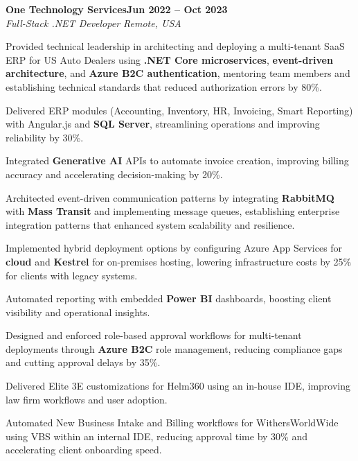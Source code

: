 \documentclass[letterpaper,10pt]{article}
\newcommand{\headingBf}[2]{
  \hspace{10pt}\textbf{#1}\hfill\textbf{#2}\\
}
\newcommand{\headingIt}[2]{
  \hspace{10pt}\textit{#1}\hfill\textit{#2}\\
}
\newenvironment{resume_list}{
  \vspace{-7pt}
  \begin{itemize}[itemsep=-2px, parsep=1pt, leftmargin=30pt]
}{
  \end{itemize}
}
\begin{document}
\headingBf{One Technology Services}{Jun 2022 -- Oct 2023}
\headingIt{Full-Stack .NET Developer \hfill Remote, USA}{}
\begin{resume_list}
    \item Provided technical leadership in architecting and deploying a multi-tenant SaaS ERP for US Auto Dealers using \textbf{.NET Core microservices}, \textbf{event-driven architecture}, and \textbf{Azure B2C authentication}, mentoring team members and establishing technical standards that reduced authorization errors by 80\%.
    \item Delivered ERP modules (Accounting, Inventory, HR, Invoicing, Smart Reporting) with Angular.js and \textbf{SQL Server}, streamlining operations and improving reliability by 30\%.
    \item Integrated \textbf{Generative AI} APIs to automate invoice creation, improving billing accuracy and accelerating decision-making by 20\%.
    \item Architected event-driven communication patterns by integrating \textbf{RabbitMQ} with \textbf{Mass Transit} and implementing message queues, establishing enterprise integration patterns that enhanced system scalability and resilience.
    \item Implemented hybrid deployment options by configuring Azure App Services for \textbf{cloud} and \textbf{Kestrel} for on-premises hosting, lowering infrastructure costs by 25\% for clients with legacy systems.
    \item Automated reporting with embedded \textbf{Power BI} dashboards, boosting client visibility and operational insights.   
    \item Designed and enforced role-based approval workflows for multi-tenant deployments through \textbf{Azure B2C} role management, reducing compliance gaps and cutting approval delays by 35\%.
    \item Delivered Elite 3E customizations for Helm360 using an in-house IDE, improving law firm workflows and user adoption.
    \item Automated New Business Intake and Billing workflows for WithersWorldWide using VBS within an internal IDE, reducing approval time by 30\% and accelerating client onboarding speed.
\end{resume_list}
\end{document}

